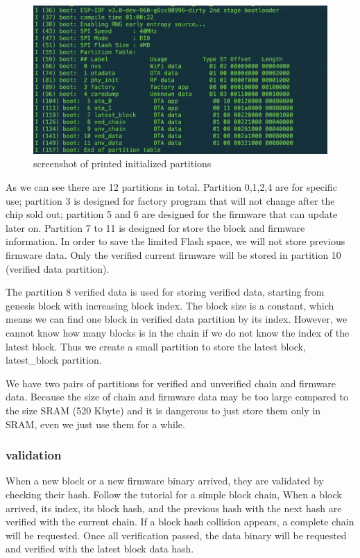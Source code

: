 \documentclass{article}
\begin{document}
          \begin{figure}[h]
            \centering
            \includegraphics[scale=0.3]{partitionTable}
            \caption{screenshot of printed initialized partitions}
            \label{fig:partition table}
          \end{figure}

          As we can see there are 12 partitions in total. Partition 0,1,2,4 are for specific use; partition 3 is designed for factory program that will not change after the chip sold out; partition 5 and 6 are designed for the firmware that can update later on. Partition 7 to 11 is designed for store the block and firmware information. In order to save the limited Flash space, we will not store previous firmware data. Only the verified current firmware will be stored in partition 10 (verified data partition).

          The partition 8 verified data is used for storing verified data, starting from genesis block with increasing block index. The block size is a constant, which means we can find one block in verified data partition by its index. However, we cannot know how many blocks is in the chain if we do not know the index of the latest block. Thus we create a small partition to store the latest block, latest\_block partition.

          We have two pairs of partitions for verified and unverified chain and firmware data. Because the size of chain and firmware data may be too large compared to the size SRAM (520 Kbyte) and it is dangerous to just store them only in SRAM, even we just use them for a while.

      \subsubsection{validation}
          When a new block or a new firmware binary arrived, they are validated by checking their hash. Follow the tutorial for a simple block chain\citep{simpleBlockchain}, When a block arrived, its index, its block hash, and the previous hash with the next hash are verified with the current chain. If a block hash collision appears, a complete chain will be requested. Once all verification passed, the data binary will be requested and verified with the latest block data hash.
\end{document}
